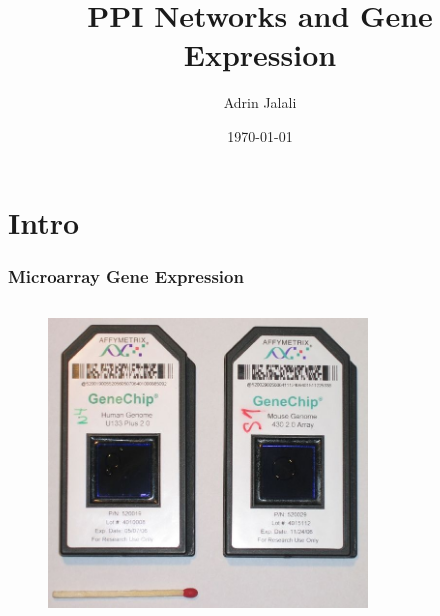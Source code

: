 \documentclass{beamer}
\begin{document}
\title{PPI Networks and Gene Expression}  
\author{Adrin Jalali}
\date{\today} 

\begin{frame}
\titlepage
\end{frame}


\section{Intro}
\begin{frame}[plain]
  \frametitle{Microarray Gene Expression}
  \begin{columns}
    \begin{column}{0.5\textwidth}
      \begin{figure}
        \includegraphics[width=0.9\textwidth]{Affymetrix-microarray}
      \end{figure}
    \end{column}
    \begin{column}{0.5\textwidth}
      \begin{figure}

\end{figure}
\end{column}
\end{columns}
\end{frame}
\end{document}
